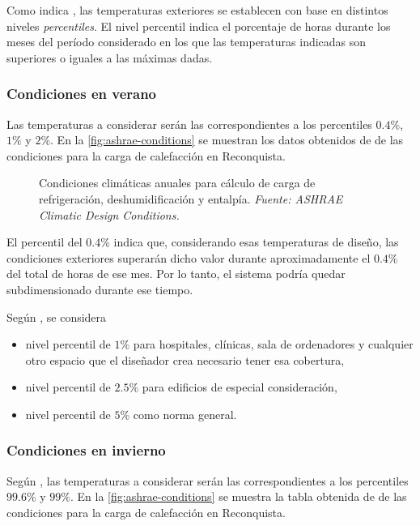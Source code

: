 Como indica \textcite{carrier2009}, las temperaturas exteriores se establecen con base en distintos niveles \emph{percentiles}. El nivel percentil indica el porcentaje de horas durante los meses del período considerado en los que las temperaturas indicadas son superiores o iguales a las máximas dadas. 

\subsubsection{Condiciones en verano}

Las temperaturas a considerar serán las correspondientes a los percentiles $0.4\%$, $1\%$ y $2\%$. En la \autoref{fig:ashrae-conditions} se muestran los datos obtenidos de \textcite{ashrae2025conditions} de las condiciones para la carga de calefacción en Reconquista.

\begin{figure}
	\centering\caption{Condiciones climáticas anuales para cálculo de carga de refrigeración, deshumidificación y entalpía. \emph{Fuente: ASHRAE Climatic Design Conditions.}}
	\label{fig:ashrae-conditions}
	
\end{figure}

El percentil del $0.4\%$ indica que, considerando esas temperaturas de diseño, las condiciones exteriores superarán dicho valor durante aproximadamente el $0.4\%$ del total de horas de ese mes. Por lo tanto, el sistema podría quedar subdimensionado durante ese tiempo.

Según \textcite{carrier2009}, se considera
\begin{itemize}
	\item nivel percentil de $1\%$ para hospitales, clínicas, sala de ordenadores y cualquier otro espacio que el diseñador crea necesario tener esa cobertura,
	\item nivel percentil de $2.5\%$ para edificios de especial consideración,
	\item nivel percentil de $5\%$ como norma general.
\end{itemize}

\subsubsection{Condiciones en invierno}

Según \citeauthor{ashrae2025conditions}, las temperaturas a considerar serán las correspondientes a los percentiles $99.6\%$ y $99\%$. En la \autoref{fig:ashrae-conditions} se muestra la tabla obtenida de \textcite{ashrae2025conditions} de las condiciones para la carga de calefacción en Reconquista.

